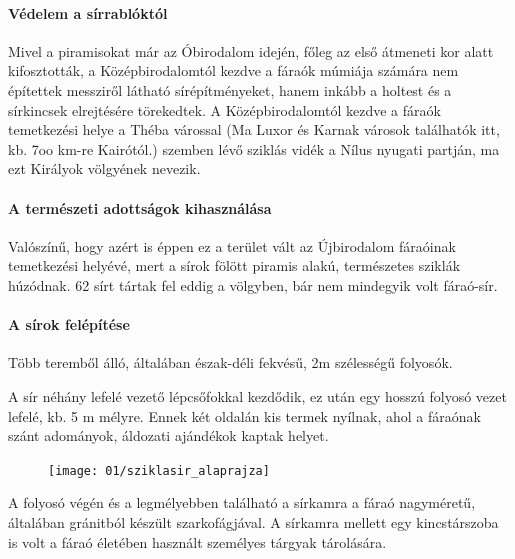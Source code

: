 \paragraph{Védelem a sírrablóktól} Mivel a piramisokat már az Óbirodalom idején, főleg az első átmeneti kor alatt kifosztották, a Középbirodalomtól kezdve a fáraók múmiája számára nem építettek messziről látható sírépítményeket, hanem inkább a holtest és a sírkincsek elrejtésére törekedtek. A Középbirodalomtól kezdve a fáraók temetkezési helye a Théba várossal (Ma Luxor és Karnak városok találhatók itt, kb. 7oo km-re Kairótól.) szemben lévő sziklás vidék a Nílus nyugati partján, ma ezt Királyok völgyének nevezik.

\paragraph{A természeti adottságok kihasználása}Valószínű, hogy azért is éppen ez a terület vált az Újbirodalom fáraóinak temetkezési helyévé, mert a sírok fölött piramis alakú, természetes sziklák húzódnak. 62 sírt tártak fel eddig a völgyben, bár nem mindegyik volt fáraó-sír.

\paragraph{A sírok felépítése} Több teremből álló, általában észak-déli fekvésű, 2m szélességű folyosók.

A sír néhány lefelé vezető lépcsőfokkal kezdődik, ez után egy hosszú folyosó vezet lefelé, kb. 5 m mélyre. Ennek két oldalán kis termek nyílnak, ahol a fáraónak szánt adományok, áldozati ajándékok kaptak helyet. 

\begin{figure}
	\begin{tcolorbox}[enhanced,colframe=gray!50!white,
		colbacktitle=gray!15!white,
		coltitle=gray!50!black,
		borderline={0.5mm}{0mm}{gray!15!white},
		borderline={0.5mm}{0mm}{gray!50!white,dashed},
		attach boxed title to top center={yshift=-2mm},
		boxed title style={boxrule=0.4pt},
		title=Sziklasír felépítése]{
			\texttt{[image: 01/sziklasir\_alaprajza]}}
	\end{tcolorbox}
\end{figure}

A folyosó végén és a legmélyebben található a sírkamra a fáraó nagyméretű, általában gránitból készült szarkofágjával. A sírkamra mellett egy kincstárszoba is volt a fáraó életében használt személyes tárgyak tárolására.

